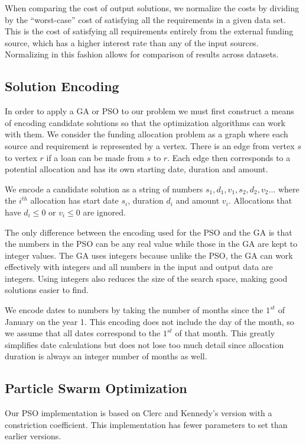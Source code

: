 \documentclass{sig-alternate}
\begin{document}
When comparing the cost of output solutions, we normalize the costs by dividing by the ``worst-case'' cost of satisfying all the requirements in a given data set. This is the cost of satisfying all requirements entirely from the external funding source, which has a higher interest rate than any of the input sources. Normalizing in this fashion allows for comparison of results across datasets.

\subsection{Solution Encoding}
In order to apply a GA or PSO to our problem we must first construct a means of encoding candidate solutions so that the optimization algorithms can work with them. We consider the funding allocation problem as a graph where each source and requirement is represented by a vertex. There is an edge from vertex $s$ to vertex $r$ if a loan can be made from $s$ to $r$. Each edge then corresponds to a potential allocation and has its own starting date, duration and amount.

We encode a candidate solution as a string of numbers $s_1, d_1, v_1, s_2, d_2, v_2...$ where the $i^{th}$ allocation has start date $s_i$, duration $d_i$ and amount $v_i$. Allocations that have $d_i \leq 0$ or $v_i \leq 0$ are ignored.

The only difference between the encoding used for the PSO and the GA is that the numbers in the PSO can be any real value while those in the GA are kept to integer values. The GA uses integers because unlike the PSO, the GA can work effectively with integers and all numbers in the input and output data are integers. Using integers also reduces the size of the search space, making good solutions easier to find.

We encode dates to numbers by taking the number of months since the $1^{st}$ of January on the year 1. This encoding does not include the day of the month, so we assume that all dates correspond to the $1^{st}$ of that month. This greatly simplifies date calculations but does not lose too much detail since allocation duration is always an integer number of months as well.

\subsection{Particle Swarm Optimization}
Our PSO implementation is based on Clerc and Kennedy's version with a constriction coefficient\cite{Clerc2002}. This implementation has fewer parameters to set than earlier versions.
\end{document}
